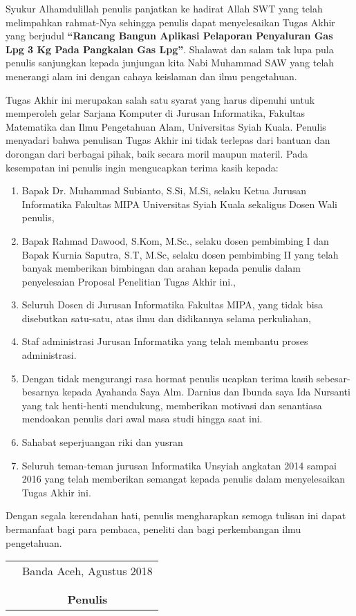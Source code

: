 \preface %


\par Syukur Alhamdulillah penulis panjatkan ke hadirat Allah SWT yang telah melimpahkan rahmat-Nya sehingga penulis dapat menyelesaikan Tugas Akhir yang berjudul \textbf{“Rancang Bangun Aplikasi Pelaporan Penyaluran Gas Lpg 3 Kg Pada Pangkalan Gas Lpg”}. Shalawat dan salam tak lupa pula penulis sanjungkan kepada junjungan kita Nabi Muhammad SAW yang telah menerangi alam ini dengan cahaya keislaman dan ilmu pengetahuan.
\par Tugas Akhir ini merupakan salah satu syarat yang harus dipenuhi untuk memperoleh gelar Sarjana Komputer di Jurusan Informatika, Fakultas Matematika dan Ilmu Pengetahuan Alam, Universitas Syiah Kuala. Penulis menyadari bahwa penulisan Tugas Akhir ini tidak terlepas dari bantuan dan dorongan dari berbagai pihak, baik secara moril maupun materil. Pada kesempatan ini penulis ingin mengucapkan terima kasih kepada:

\begin{enumerate}
	\item{Bapak Dr. Muhammad Subianto, S.Si, M.Si, selaku Ketua Jurusan Informatika Fakultas MIPA Universitas Syiah Kuala sekaligus Dosen Wali penulis,}
	\item{Bapak Rahmad Dawood, S.Kom, M.Sc., selaku dosen pembimbing I dan Bapak Kurnia Saputra, S.T, M.Sc, selaku dosen pembimbing II yang telah banyak memberikan bimbingan dan arahan kepada penulis dalam penyelesaian Proposal Penelitian Tugas Akhir ini.,}
	\item{Seluruh Dosen di Jurusan Informatika Fakultas MIPA, yang tidak bisa disebutkan satu-satu, atas ilmu dan didikannya selama perkuliahan,}
	\item {Staf administrasi Jurusan Informatika yang telah membantu proses administrasi.}
	\item{Dengan tidak mengurangi rasa hormat penulis ucapkan terima kasih sebesar- besarnya kepada Ayahanda Saya Alm. Darnius dan Ibunda saya Ida Nursanti yang tak henti-henti mendukung, memberikan motivasi dan senantiasa mendoakan penulis dari awal masa studi hingga saat ini.}
	\item {Sahabat seperjuangan riki dan yusran } 
	\item{Seluruh teman-teman jurusan Informatika Unsyiah angkatan 2014 sampai 2016 yang telah memberikan semangat kepada penulis dalam menyelesaikan Tugas Akhir ini.}
\end{enumerate}


Dengan segala kerendahan hati, penulis mengharapkan semoga tulisan ini
dapat bermanfaat bagi para pembaca, peneliti dan bagi perkembangan ilmu
pengetahuan.

\vspace{0.5cm}


\begin{tabular}{p{7.5cm}c}
	&Banda Aceh, Agustus 2018\\
	&\\
	&\\
	&\textbf{Penulis}
\end{tabular}